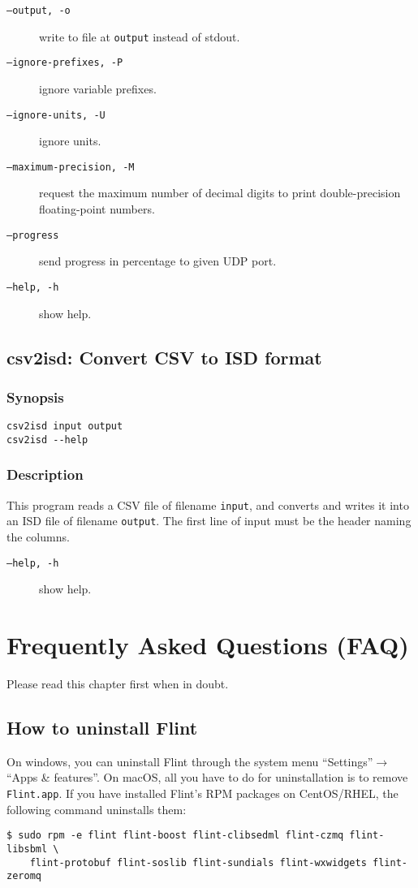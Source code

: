 \documentclass[a4paper,10pt]{report}
\newcommand{\filename}[1]{{\tt #1}}
\begin{document}
\begin{description}
\item[{\tt --output, -o}] write to file at {\tt output} instead of stdout.
\item[{\tt --ignore-prefixes, -P}] ignore variable prefixes.
\item[{\tt --ignore-units, -U}] ignore units.
\item[{\tt --maximum-precision, -M}] request the maximum number of decimal
digits to print double-precision floating-point numbers.
\item[{\tt --progress}] send progress in percentage to given UDP port.
\item[{\tt --help, -h}] show help.
\end{description}

\section{csv2isd: Convert CSV to ISD format}\label{sec:csv2isd}

\subsection{Synopsis}
\begin{verbatim}
csv2isd input output
csv2isd --help
\end{verbatim}

\subsection{Description}
This program reads a CSV file of filename {\tt input}, and converts and writes
it into an ISD file of filename {\tt output}.
The first line of input must be the header naming the columns.

\begin{description}
\item[{\tt --help, -h}] show help.
\end{description}


\chapter{Frequently Asked Questions (FAQ)}
Please read this chapter first when in doubt.

\section{How to uninstall Flint}
On windows, you can uninstall Flint through the system menu ``Settings''$\rightarrow$``Apps \& features''.
On macOS, all you have to do for uninstallation is to remove \filename{Flint.app}.
If you have installed Flint's RPM packages on CentOS/RHEL, the following command
uninstalls them:
\begin{verbatim}
$ sudo rpm -e flint flint-boost flint-clibsedml flint-czmq flint-libsbml \
    flint-protobuf flint-soslib flint-sundials flint-wxwidgets flint-zeromq
\end{verbatim}
\end{document}
